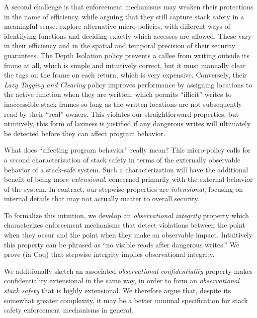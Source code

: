 \documentclass[acmsmall,review,anonymous]{acmart}\settopmatter{printfolios=true,printccs=false,printacmref=false}
\begin{document}
A second challenge is that enforcement mechanisms may weaken their protections
in the name of efficiency, while arguing that they still capture stack safety in a meaningful sense.
\citet{DBLP:conf/sp/RoesslerD18} explore alternative micro-policies, with different
ways of identifying functions and deciding exactly which accesses are allowed.
These vary in their efficiency and in the spatial and temporal precision of their
security guarantees.
The Depth Isolation policy prevents a callee from writing outside its frame
at all, which is simple and intuitively correct, but it must manually clear the tags
on the frame on each return, which is very expensive. Conversely, their
\emph{Lazy Tagging and Clearing} policy improves
performance by assigning locations to the active function when they are written, which
permits  ``illicit'' writes to inaccessible stack frames so long as the
written locations are not subsequently read by their ``real'' owners. This violates our
straightforward properties, but ntuitively,
this form of laziness is justified if any dangerous writes will
ultimately be detected before they can affect program behavior.

What does ``affecting program behavior'' really mean? This micro-policy
calls for a second characterization of stack safety in terms of the externally
observable behavior of a stack-safe system. Such a characterization will have the
additional benefit of being more {\em extensional}, concerned primarily with the
external behavior of the system. In contract, our stepwise properties are {\em intensional},
focusing on internal details that may not actually matter to overall security.

To formalize this intuition, we develop an \emph{observational integrity} property which
characterizes enforcement mechanisms that detect violations between the point when
they occur and the point when they make an observable impact. Intuitively this property
can be phrased as ``no visible reads after dangerous writes.''  We prove (in Coq) that stepwise
integrity implies observational integrity. 

We additionally sketch an associated {\em observational confidentiality} property
makes confidentiality extensional in the same way, in order to form an
{\em observational stack safety} that is highly extensional.
We therefore argue that, despite its somewhat greater complexity,
it may be a better minimal specification for
stack safety enforcement mechanisms in general.
\end{document}
